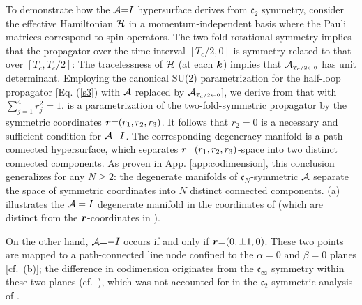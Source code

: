 To demonstrate how the ${\cal A}{=}I$ hypersurface derives from $\mathfrak{c}_2$ symmetry, consider  the effective Hamiltonian ${\cal H}$ 
in a momentum-independent basis where the Pauli matrices correspond to spin operators. The two-fold rotational symmetry 
implies that the propagator over the time interval $[T_c/2,0]$ is symmetry-related to that over $[T_c,T_c/2]$:
The tracelessness of ${\cal H}$ (at each $\boldsymbol{k}$) implies that  ${{\cal A}}_{\scriptscriptstyle{T_c/2\leftarrow 0}}$  has unit determinant. Employing the canonical SU(2) parametrization for the half-loop propagator [Eq. (\ref{s3}) with ${\cal \bar{A}}$ replaced by ${{\cal A}}_{\scriptscriptstyle{T_c/2\leftarrow 0}}$], we derive from  that
with $\sum_{j=1}^4r_j^2{=}1$.  is a parametrization of the two-fold-symmetric propagator by the symmetric coordinates $\boldsymbol{r}{=}(r_1,r_2,r_3)$. It follows that $r_2{=}0$ is a necessary and sufficient condition for ${\cal A}{=}I$. The corresponding degeneracy manifold is a path-connected hypersurface, which separates $\boldsymbol{r}{=}(r_1,r_2,r_3)$-space into two distinct connected components. As proven in App. \ref{app:codimension}, this conclusion generalizes for any $N{\geq}2$: the degenerate manifolds of $\mathfrak{c}_N$-symmetric ${\cal A}$ separate the space of symmetric coordinates into $N$ distinct connected components. (a) illustrates the ${\cal A}=I$ degenerate manifold {in the coordinates of   (which are distinct from the $\boldsymbol{r}$-coordinates in ).} 

On the other hand, ${\cal A}{=}{-}I$ occurs if and only if $\boldsymbol{r}{=}(0,{\pm} 1,0)$. These two points are mapped to a path-connected line node confined to the $\alpha{=}0$ and $\beta{=}0$ planes [cf.\ (b)]; the difference in codimension originates from the $\mathfrak{c}_{\infty}$ symmetry within these two planes (cf.\ ), which was not accounted for in the $\mathfrak{c}_2$-symmetric analysis of .



